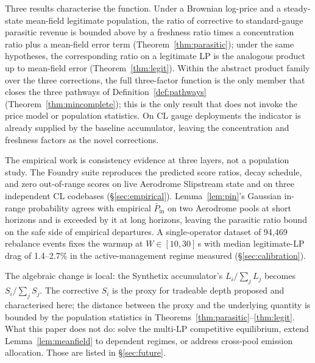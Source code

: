\documentclass[11pt,a4paper]{article}
\theoremstyle{definition}
\theoremstyle{plain}
\theoremstyle{remark}
\begin{document}
Three results characterise the function. Under a Brownian log-price and a steady-state mean-field legitimate population, the ratio of corrective to standard-gauge parasitic revenue is bounded above by a freshness ratio times a concentration ratio plus a mean-field error term (Theorem~\ref{thm:parasitic}); under the same hypotheses, the corresponding ratio on a legitimate LP is the analogous product up to mean-field error (Theorem~\ref{thm:legit}). Within the abstract product family over the three corrections, the full three-factor function is the only member that closes the three pathways of Definition~\ref{def:pathways} (Theorem~\ref{thm:mincomplete}); this is the only result that does not invoke the price model or population statistics. On CL gauge deployments the indicator is already supplied by the baseline accumulator, leaving the concentration and freshness factors as the novel corrections.

The empirical work is consistency evidence at three layers, not a population study. The Foundry suite reproduces the predicted score ratios, decay schedule, and zero out-of-range scores on live Aerodrome Slipstream state and on three independent CL codebases (\S\ref{sec:empirical}). Lemma~\ref{lem:pin}'s Gaussian in-range probability agrees with empirical $\bar P_{\text{in}}$ on two Aerodrome pools at short horizons and is exceeded by it at long horizons, leaving the parasitic ratio bound on the safe side of empirical departures. A single-operator dataset of 94{,}469 rebalance events fixes the warmup at $W \in [10, 30]$\,s with median legitimate-LP drag of 1.4--2.7\% in the active-management regime measured (\S\ref{sec:calibration}).

The algebraic change is local: the Synthetix accumulator's $L_i/\sum_j L_j$ becomes $S_i/\sum_j S_j$. The corrective $S_i$ is the proxy for tradeable depth proposed and characterised here; the distance between the proxy and the underlying quantity is bounded by the population statistics in Theorems~\ref{thm:parasitic}--\ref{thm:legit}. What this paper does not do: solve the multi-LP competitive equilibrium, extend Lemma~\ref{lem:meanfield} to dependent regimes, or address cross-pool emission allocation. Those are listed in \S\ref{sec:future}.
\end{document}
